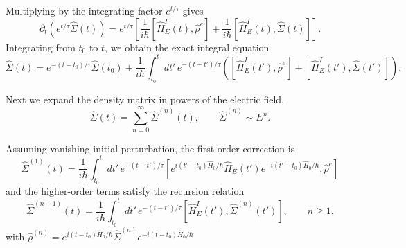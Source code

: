 \documentclass[aps, prb, superscriptaddress, longbibliography]{revtex4-2}
\numberwithin{equation}{section}
\begin{document}
Multiplying by the integrating factor $e^{t/\tau}$ gives
\begin{equation}
\partial_t\!\left(e^{t/\tau}\hat\Sigma(t)\right)
=
e^{t/\tau}
\left[
\frac{1}{i\hbar}[\hat H_E^I(t),\hat\rho^e]
+
\frac{1}{i\hbar}[\hat H_E^I(t),\hat\Sigma(t)]
\right].
\end{equation}
Integrating from $t_0$ to $t$, we obtain the exact integral equation
\begin{equation}
\hat\Sigma(t)
=
e^{-(t-t_0)/\tau}\hat\Sigma(t_0)
+
\frac{1}{i\hbar}\int_{t_0}^t dt'\,
e^{-(t-t')/\tau}
\left(
[\hat H_E^I(t'),\hat\rho^e]
+
[\hat H_E^I(t'),\hat\Sigma(t')]
\right).
\end{equation}

Next we expand the density matrix in powers of the electric field,
\begin{equation}
\hat\Sigma(t)=\sum_{n=0}^{\infty}\hat\Sigma^{(n)}(t),
\qquad
\hat\Sigma^{(n)}\sim E^n.
\end{equation}

Assuming vanishing initial perturbation, the first-order correction is
\begin{equation}
\boxed{
\hat\Sigma^{(1)}(t)
=
\frac{1}{i\hbar}\int_{t_0}^t dt'\,
e^{-(t-t')/\tau}
[e^{i(t'-t_0)\hat H_0/\hbar}\hat H_E(t')e^{-i(t'-t_0)\hat H_0/\hbar},\hat\rho^e]
}
\end{equation}
and the higher-order terms satisfy the recursion relation
\begin{equation}
\boxed{
\hat\Sigma^{(n+1)}(t)
=
\frac{1}{i\hbar}\int_{t_0}^t dt'\,
e^{-(t-t')/\tau}
[\hat H_E^I(t'),\hat\Sigma^{(n)}(t')],
\qquad n\ge 1.
}
\end{equation}
with $\hat \rho^{(n)} =e^{i(t-t_0)\hat H_0/\hbar}\hat \Sigma^{(n)}e^{-i(t-t_0)\hat H_0/\hbar}$
\end{document}
